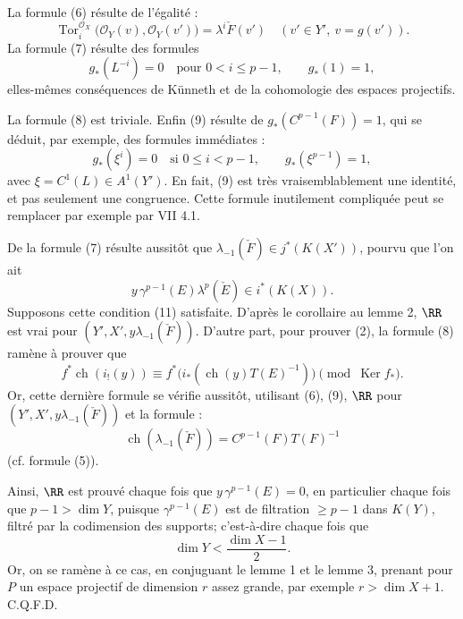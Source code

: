 \documentclass[11pt]{article}
\newcommand{\ch}{\operatorname{ch}}
\newcommand{\Tor}{\operatorname{Tor}}
\providecommand{\ch}{\operatorname{ch}}
\providecommand{\Tor}{\operatorname{Tor}}
\providecommand{\Ker}{\operatorname{Ker}}
\begin{document}
La formule (6) résulte de l'égalité :
\begin{equation}\tag{6 bis}
  \Tor_i^{\mathcal O_X}\bigl(\mathcal O_Y(v),\mathcal O_Y(v')\bigr)
  =
  \lambda^i\check F(v')
  \quad (v'\in Y',\ v=g(v')).
\end{equation}
La formule (7) résulte des formules
\begin{equation}\tag{10}
  g_*(L^{-i})=0\quad\text{pour }0<i\leq p-1,\qquad g_*(1)=1,
\end{equation}
elles-mêmes conséquences de Künneth et de la cohomologie des espaces projectifs.

La formule (8) est triviale. Enfin (9) résulte de \(g_*(C^{p-1}(F))=1\), qui se déduit, par exemple, des formules immédiates :
\begin{equation}\tag{10 bis}
  g_*(\xi^i)=0\quad\text{si }0\leq i<p-1,\qquad
  g_*(\xi^{p-1})=1,
\end{equation}
avec \(\xi=C^1(L)\in A^1(Y')\). En fait, (9) est très vraisemblablement une identité, et pas seulement une congruence. Cette formule inutilement compliquée peut se remplacer par exemple par VII 4.1.

De la formule (7) résulte aussitôt que \(\lambda_{-1}(\check F)\in j^*(K(X'))\), pourvu que l'on ait
\begin{equation}\tag{11}
  y\,\gamma^{p-1}(E)\lambda^p(\check E)\in i^*(K(X)).
\end{equation}
Supposons cette condition (11) satisfaite. D'après le corollaire au lemme 2, \(\RR\) est vrai pour \((Y',X',y\lambda_{-1}(\check F))\). D'autre part, pour prouver (2), la formule (8) ramène à prouver que
\begin{equation}\tag{12}
  f^*\ch(i_!(y))
  \equiv
  f^*\bigl(i_*(\ch(y)T(E)^{-1})\bigr)
  \pmod{\Ker f_*}.
\end{equation}
Or, cette dernière formule se vérifie aussitôt, utilisant (6), (9), \(\RR\) pour \((Y',X',y\lambda_{-1}(\check F))\) et la formule :
\begin{equation}\tag{13}
  \ch(\lambda_{-1}(\check F))=C^{p-1}(F)T(F)^{-1}
\end{equation}
(cf. formule (5)).

Ainsi, \(\RR\) est prouvé chaque fois que \(y\,\gamma^{p-1}(E)=0\), en particulier chaque fois que \(p-1>\dim Y\), puisque \(\gamma^{p-1}(E)\) est de filtration \(\geq p-1\) dans \(K(Y)\), filtré par la codimension des supports; c'est-à-dire chaque fois que
\[
  \dim Y < \frac{\dim X-1}{2}.
\]
Or, on se ramène à ce cas, en conjuguant le lemme 1 et le lemme 3, prenant pour \(P\) un espace projectif de dimension \(r\) assez grande, par exemple \(r>\dim X+1\). C.Q.F.D.
\end{document}

